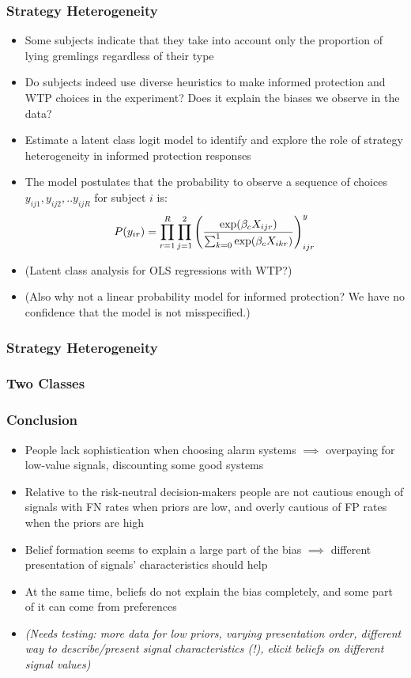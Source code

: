 \documentclass[11pt,hyperref={bookmarks=false}]{beamer}
\begin{document}
\begin{frame}
\frametitle{Strategy Heterogeneity}
\begin{itemize}
\item Some subjects indicate that they take into account only the proportion of lying gremlings regardless of their type
\item Do subjects indeed use diverse heuristics to make informed protection and WTP choices in the experiment? Does it explain the biases we observe in the data?
\item Estimate a latent class logit model to identify and explore the role of strategy heterogeneity in informed protection responses
\item The model postulates that the probability to observe a sequence of choices $y_{ij1},y_{ij2},..y_{ijR}$ for subject $i$ is:
$$P(y_{ir})=\prod_{r=1}^R \prod_{j=1}^2\left({\exp(\beta_c X_{ijr})\over \sum_{k=0}^1 \exp(\beta_c X_{ikr})} \right)^y_{ijr}$$
\item (Latent class analysis for OLS regressions with WTP?)
\item (Also why not a linear probability model for informed protection? We have no confidence that the model is not misspecified.)
\end{itemize}
\end{frame}


\begin{frame}
\frametitle{Strategy Heterogeneity}
\scriptsize

\end{frame}

\begin{frame}
\frametitle{Two Classes}
\scriptsize

\end{frame}


\begin{frame}
\frametitle{Conclusion}
\begin{itemize}
\item People lack sophistication when choosing alarm systems $\implies$ overpaying for low-value signals, discounting some good systems
\item Relative to the risk-neutral decision-makers people are not cautious enough of signals with FN rates when priors are low, and overly cautious of FP rates when the priors are high 
\item Belief formation seems to explain a large part of the bias $\implies$ different presentation of signals' characteristics should help
\item At the same time, beliefs do not explain the bias completely, and some part of it can come from preferences
\item \textit{(Needs testing: more data for low priors, varying presentation order, different way to describe/present signal characteristics (!), elicit beliefs on different signal values)}
\end{itemize}
\end{frame}
\end{document}
